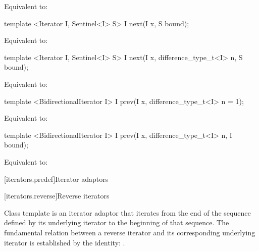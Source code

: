 \begin{itemdescr}
\pnum
\effects Equivalent to: 
\end{itemdescr}

\begin{itemdecl}
template <Iterator I, Sentinel<I> S>
  I next(I x, S bound);
\end{itemdecl}

\begin{itemdescr}
\pnum
\effects Equivalent to: 
\end{itemdescr}

\begin{itemdecl}
template <Iterator I, Sentinel<I> S>
  I next(I x, difference_type_t<I> n, S bound);
\end{itemdecl}

\begin{itemdescr}
\pnum
\effects Equivalent to: 
\end{itemdescr}

%
\begin{itemdecl}
template <BidirectionalIterator I>
  I prev(I x, difference_type_t<I> n = 1);
\end{itemdecl}

\begin{itemdescr}
\pnum
\effects Equivalent to: 
\end{itemdescr}

\begin{itemdecl}
template <BidirectionalIterator I>
  I prev(I x, difference_type_t<I> n, I bound);
\end{itemdecl}

\begin{itemdescr}
\pnum
\effects Equivalent to: 
\end{itemdescr}

[iterators.predef]{Iterator adaptors}

[iterators.reverse]{Reverse iterators}

\pnum
Class template  is an iterator adaptor that iterates from the end of the sequence defined by its underlying iterator to the beginning of that sequence.
The fundamental relation between a reverse iterator and its corresponding underlying iterator
is established by the identity:
.

